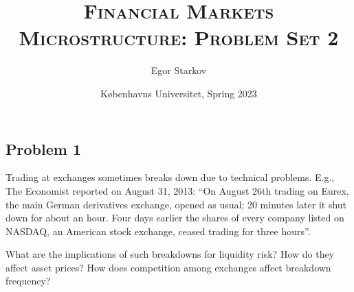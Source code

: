 \documentclass[11pt
, answers
]{exam}
\begin{document}
	
	
\title{\textsc{Financial Markets Microstructure: Problem Set 2}}
\date{K{\o}benhavns Universitet, Spring 2023}
\author{Egor Starkov}


\maketitle



\quad


\subsection*{Problem 1}

Trading at exchanges sometimes breaks down due to technical problems. E.g., The Economist reported on August 31, 2013: ``On August 26th trading on Eurex, the main German derivatives exchange, opened as usual; 20 minutes later it shut down for about an hour. Four days earlier the shares of every company listed on NASDAQ, an American stock exchange, ceased trading for three hours''. 

What are the implications of such breakdowns for liquidity risk? How do they affect asset prices? How does competition among exchanges affect breakdown frequency?
\end{document}
